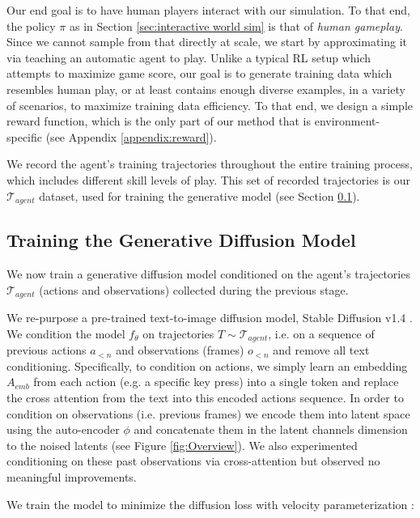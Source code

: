 \documentclass{article} %
\begin{document}
Our end goal is to have human players interact with our simulation. To that end, the policy $\pi$ as in Section \ref{sec:interactive world sim} is that of \emph{human gameplay}. Since we cannot sample from that directly at scale, we start by approximating it via teaching an automatic agent to play. Unlike a typical RL setup which attempts to maximize game score, our goal is to generate training data which resembles human play, or at least contains enough diverse examples, in a variety of scenarios, to maximize training data efficiency.
To that end, we design a simple reward function, which is the only part of our method that is environment-specific (see Appendix \ref{appendix:reward}).

We record the agent's training trajectories throughout the entire training process, which includes different skill levels of play.
This set of recorded trajectories is our $\mathcal{T}_{agent}$ dataset, used for training the generative model (see Section \ref{training-diffusion-model}).

\subsection{Training the Generative Diffusion Model}
\label{training-diffusion-model}

We now train a generative diffusion model conditioned on the agent's trajectories $\mathcal{T}_{agent}$ (actions and observations) collected during the previous stage.

We re-purpose a pre-trained text-to-image diffusion model, Stable Diffusion v1.4 \citep{rombach2022high}.
We condition the model $f_{\theta}$ on trajectories $T \sim \mathcal{T}_{agent}$, i.e. on a sequence of previous actions $a_{<n}$ and observations (frames) $o_{<n}$ and remove all text conditioning.
Specifically, to condition on actions, we simply learn an embedding $A_{emb}$ from each action (e.g. a specific key press) into a single token and replace the cross attention from the text into this encoded actions sequence.
In order to condition on observations (i.e. previous frames) we encode them into latent space using the auto-encoder $\phi$ and concatenate them in the latent channels dimension to the noised latents (see Figure \ref{fig:Overview}). We also experimented conditioning on these past observations via cross-attention but observed no meaningful improvements.

We train the model to minimize the diffusion loss with velocity parameterization \citep{salimans2022progressivedistillationfastsampling}:
\end{document}
